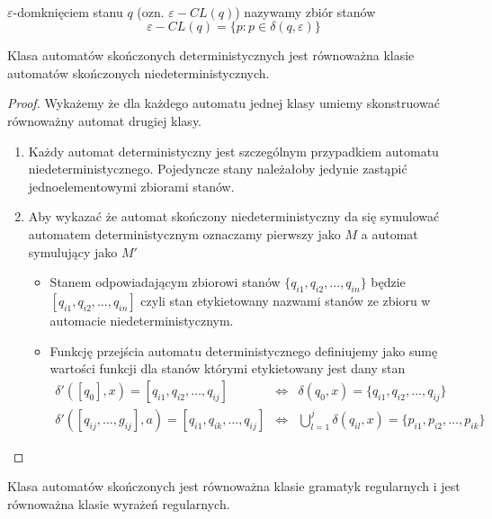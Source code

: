 \begin{df}~\\
	$\varepsilon$-domknięciem stanu $q$ (ozn. $\varepsilon-CL(q)$) nazywamy zbiór stanów
	\begin{equation}
		\varepsilon-CL(q) = \{p : p \in \delta(q, \varepsilon)\}
	\end{equation}
\end{df}

\begin{tw}
	Klasa automatów skończonych deterministycznych jest równoważna klasie automatów skończonych niedeterministycznych.
	\begin{proof}
		Wykażemy że dla każdego automatu jednej klasy umiemy skonstruować równoważny automat drugiej klasy.
		\begin{enumerate}
			\item Każdy automat deterministyczny jest szczególnym przypadkiem automatu niedeterministycznego. Pojedyncze
			stany należałoby jedynie zastąpić jednoelementowymi zbiorami stanów.
			\item Aby wykazać że automat skończony niedeterministyczny da się symulować automatem deterministycznym oznaczamy
			pierwszy jako $M$ a automat symulujący jako $M'$
			\begin{itemize}
				\item Stanem odpowiadającym zbiorowi stanów $\{q_{i1}, q_{i2}, \dots, q_{in}\}$ będzie $[q_{i1}, q_{i2}, \dots, q_{in}]$
				czyli stan etykietowany nazwami stanów ze zbioru w automacie niedeterministycznym.
				\item Funkcję przejścia automatu deterministycznego definiujemy jako sumę wartości funkcji dla stanów którymi etykietowany
				jest dany stan
				\begin{eqnarray}
					\delta'([q_0], x) = [q_{i1}, q_{i2}, \dots, q_{ij}] &\Leftrightarrow& \delta(q_0, x) = \{q_{i1}, q_{i2}, \dots, q_{ij}\} \\
					\delta'([q_{ij}, \dots, g_{ij}], a) = [q_{i1}, q_{ik}, \dots, q_{ij}] &\Leftrightarrow& \bigcup_{l=1}^{j} \delta(q_{il}, x) = \{p_{i1}, p_{i2}, \dots, p_{ik}\}
				\end{eqnarray}
			\end{itemize}
		\end{enumerate}
	\end{proof}
\end{tw}

\begin{tw}
	Klasa automatów skończonych jest równoważna klasie gramatyk regularnych i jest równoważna klasie wyrażeń regularnych.
\end{tw}


